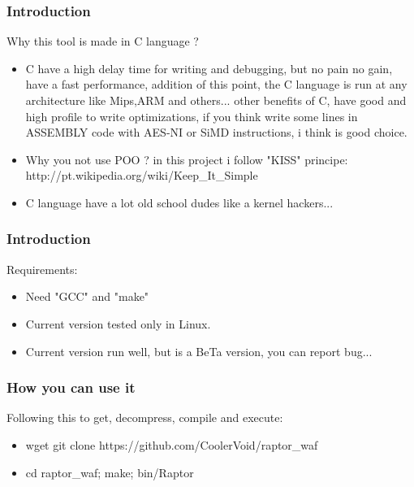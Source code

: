 \documentclass[serif,mathserif]{beamer}
\begin{document}
\begin{frame}
  \frametitle{Introduction}
  Why this tool is made in C language ?
  \begin{itemize}
  \item  C have a high delay time for writing and debugging, but no pain no gain, have a fast performance, addition of this point, the C language is run at any architecture like Mips,ARM and others... other benefits of C,  have good and high profile to write optimizations, if you think write some lines in ASSEMBLY code with AES-NI or SiMD instructions, i think is good choice. 
  \item  Why you not use POO ? in this project i follow "KISS" principe: http://pt.wikipedia.org/wiki/Keep\_It\_Simple
  \item  C language have a lot old school dudes like a kernel hackers... 
  \end{itemize}
\end{frame}



\begin{frame}
  \frametitle{Introduction}
  Requirements:
  \begin{itemize}
  \item  Need "GCC" and "make" 
  \item  Current version tested only in Linux.
  \item  Current version run well, but is a BeTa version, you can report bug...
  \end{itemize}
\end{frame}


\begin{frame}
  \frametitle{How you can use it}
  Following this to get, decompress, compile and execute:
  \begin{itemize}
  \item wget git clone https://github.com/CoolerVoid/raptor\_waf
  \item cd raptor_waf; make; bin/Raptor
  \end{itemize}
\end{frame}
\end{document}
